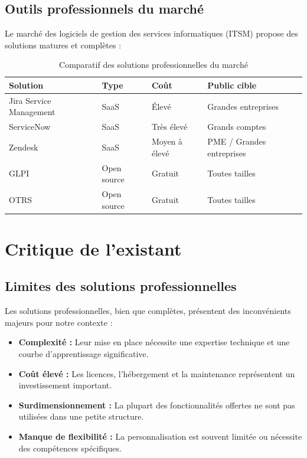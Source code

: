 \documentclass[12pt,a4paper,oneside]{report}
\renewcommand{\arraystretch}{1.3}
\begin{document}
\subsection{Outils professionnels du marché}

Le marché des logiciels de gestion des services informatiques (ITSM) propose des solutions matures et complètes :

\begin{table}[htbp]
    \centering
    \caption{Comparatif des solutions professionnelles du marché}
    \label{tab:solutions-marche}
    \renewcommand{\arraystretch}{1.5}
    \begin{tabular}{p{3cm} p{3.5cm} p{3.5cm} p{3.5cm}}
        \toprule
        \textbf{Solution} & \textbf{Type} & \textbf{Coût} & \textbf{Public cible} \\
        \midrule
        Jira Service Management & SaaS  & Élevé & Grandes entreprises \\
        ServiceNow & SaaS & Très élevé & Grands comptes \\
        Zendesk & SaaS & Moyen à élevé & PME / Grandes entreprises \\
        GLPI & Open source & Gratuit & Toutes tailles \\
        OTRS & Open source & Gratuit & Toutes tailles \\
        \bottomrule
    \end{tabular}
\end{table}

\section{Critique de l'existant}

\subsection{Limites des solutions professionnelles}

Les solutions professionnelles, bien que complètes, présentent des inconvénients majeurs pour notre contexte :
\begin{itemize}
    \item \textbf{Complexité :} Leur mise en place nécessite une expertise technique et une courbe d'apprentissage significative.
    \item \textbf{Coût élevé :} Les licences, l'hébergement et la maintenance représentent un investissement important.
    \item \textbf{Surdimensionnement :} La plupart des fonctionnalités offertes ne sont pas utilisées dans une petite structure.
    \item \textbf{Manque de flexibilité :} La personnalisation est souvent limitée ou nécessite des compétences spécifiques.
\end{itemize}
\end{document}
